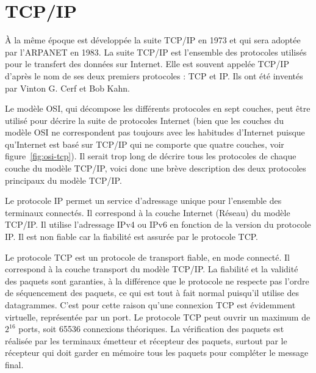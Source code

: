 \documentclass[12pt]{report}
\begin{document}
\section{TCP/IP}

À la même époque est développée la suite TCP/IP en 1973 et qui sera adoptée par l'\gls{ARPANET} en 1983. La suite TCP/IP est l'ensemble des protocoles utilisés pour le transfert des données sur Internet. Elle est souvent appelée TCP/IP d'après le nom de ses deux premiers protocoles : \gls{TCP} et \gls{IP}. Ils ont été inventés par Vinton G. Cerf et Bob Kahn.

Le modèle OSI, qui décompose les différents protocoles en sept couches, peut être utilisé pour décrire la suite de protocoles Internet (bien que les couches du modèle OSI ne correspondent pas toujours avec les habitudes d'Internet puisque qu'Internet est basé sur TCP/IP qui ne comporte que quatre couches, voir figure~\ref{fig:osi-tcp}). Il serait trop long de décrire tous les protocoles de chaque couche du modèle TCP/IP, voici donc une brève description des deux protocoles principaux du modèle TCP/IP\cite{wikitcpip}.

Le protocole IP permet un service d'adressage unique pour l'ensemble des terminaux connectés. Il correspond à la couche Internet (Réseau) du modèle TCP/IP. Il utilise l'adressage IPv4 ou IPv6 en fonction de la version du protocole IP. Il est \og non fiable \fg{} car la fiabilité est assurée par le protocole TCP\cite{wikiip}.

Le protocole TCP est un protocole de transport fiable, en mode connecté. Il correspond à la couche transport du modèle TCP/IP. La fiabilité et la validité des paquets sont garanties, à la différence que le protocole ne respecte pas l'ordre de séquencement des paquets, ce qui est tout à fait normal puisqu'il utilise des datagrammes. C'est pour cette raison qu'une connexion TCP est évidemment virtuelle, représentée par un port. Le protocole TCP peut ouvrir un maximum de $2^{16}$ ports, soit 65536 connexions théoriques. La vérification des paquets est réalisée par les terminaux émetteur et récepteur des paquets, surtout par le récepteur qui doit garder en mémoire tous les paquets pour compléter le message final\cite{wikitcp}.
\end{document}
